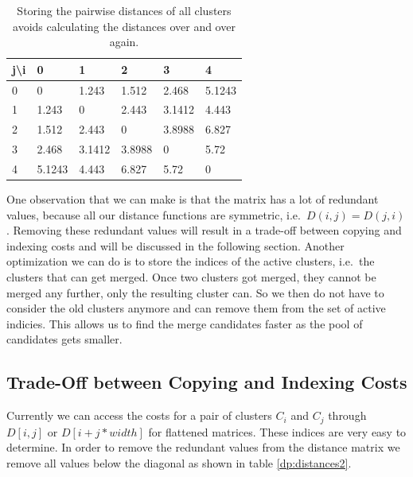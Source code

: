 \begin{table}[H]
    \centering
    \begin{tabular}{|l | l l l l l|}
    \hline
    j\textbackslash i & 0 & 1 & 2 & 3 & 4\\ \hline
    0 & 0 & 1.243 & 1.512 & 2.468 & 5.1243\\
    1 & 1.243 & 0 & 2.443 & 3.1412 & 4.443\\
    2 & 1.512 & 2.443 & 0 & 3.8988 & 6.827\\
    3 & 2.468 & 3.1412 & 3.8988 & 0 & 5.72\\
    4 & 5.1243 & 4.443 & 6.827 & 5.72 & 0\\ \hline
    \end{tabular}
    \caption{Storing the pairwise distances of all clusters avoids calculating the distances over and over again.}
    \label{dp:distances}
\end{table}

One observation that we can make is that the matrix has a lot of redundant values, because all our distance functions are symmetric, i.e.\ $D(i,j) = D(j,i)$. Removing these redundant values will result in a trade-off between copying and indexing costs and will be discussed in the following section. Another optimization we can do is to store the indices of the active clusters, i.e.\ the clusters that can get merged. Once two clusters got merged, they cannot be merged any further, only the resulting cluster can. So we then do not have to consider the old clusters anymore and can remove them from the set of active indicies. This allows us to find the merge candidates faster as the pool of candidates gets smaller.

\subsection{Trade-Off between Copying and Indexing Costs}

Currently we can access the costs for a pair of clusters $C_i$ and $C_j$ through $D[i,j]$ or $D[i + j * width]$ for flattened matrices. These indices are very easy to determine. In order to remove the redundant values from the distance matrix we remove all values below the diagonal as shown in table \ref{dp:distances2}.

